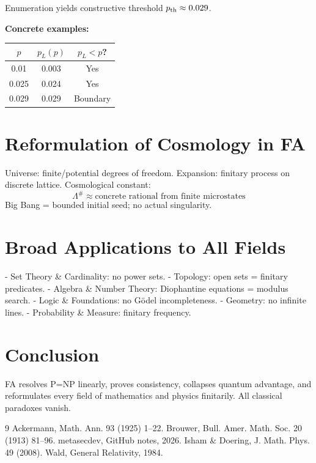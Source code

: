 \documentclass[11pt]{article}
\theoremstyle{plain}
\begin{document}
Enumeration yields constructive threshold \(p_{\rm th} \approx 0.029\).

\textbf{Concrete examples:}

\begin{table}[h]
\centering
\begin{tabular}{c|c|c}
$p$ & $p_L(p)$ & $p_L < p$? \\
\hline
0.01 & 0.003 & Yes \\
0.025 & 0.024 & Yes \\
0.029 & 0.029 & Boundary \\
\end{tabular}
\end{table}

\section{Reformulation of Cosmology in FA}
Universe: finite/potential degrees of freedom. Expansion: finitary process on discrete lattice. Cosmological constant:
\[
\Lambda^\# \approx \text{concrete rational from finite microstates}
\]
Big Bang = bounded initial seed; no actual singularity.

\section{Broad Applications to All Fields}
- Set Theory \& Cardinality: no power sets.
- Topology: open sets = finitary predicates.
- Algebra \& Number Theory: Diophantine equations = modulus search.
- Logic \& Foundations: no Gödel incompleteness.
- Geometry: no infinite lines.
- Probability \& Measure: finitary frequency.

\section{Conclusion}
FA resolves P=NP linearly, proves consistency, collapses quantum advantage, and reformulates every field of mathematics and physics finitarily. All classical paradoxes vanish.

\begin{thebibliography}{9}
 Ackermann, Math. Ann. 93 (1925) 1--22.
 Brouwer, Bull. Amer. Math. Soc. 20 (1913) 81--96.
 metasecdev, GitHub notes, 2026.
 Isham \& Doering, J. Math. Phys. 49 (2008).
 Wald, General Relativity, 1984.
\end{thebibliography}
\end{document}
